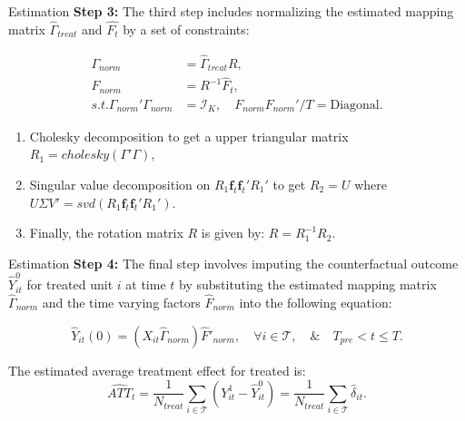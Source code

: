 \documentclass{beamer}
\begin{document}
\begin{frame}{Estimation}    
    \textbf{Step 3:} The third step includes normalizing the estimated mapping matrix $\hat{\Gamma}_{treat}$ and $\hat{F_t}$ by a set of constraints:
    
    \begin{equation*}
    \begin{aligned}
    \Gamma_{norm} &= \hat{\Gamma}_{treat} R, \\
    F_{norm} &= R^{-1} \hat{F}_t, \\
    s.t. \Gamma_{norm}'\Gamma_{norm} &= \mathcal{I}_K, \quad F_{norm} F_{norm}'/T = \text{Diagonal}.
    \end{aligned}
    \end{equation*}
    
    \begin{enumerate}
        \item Cholesky decomposition to get a upper triangular matrix $R_1 = cholesky(\Gamma' \Gamma)$,
        \item Singular value decomposition on $R_1\boldsymbol{f}_t\boldsymbol{f}_t'R_1'$ to get $R_2 = U$ where $U\Sigma V'=svd(R_1\boldsymbol{f}_t\boldsymbol{f}_t'R_1')$.
        \item Finally, the rotation matrix $R$ is given by: $R = R_1^{-1}R_2.$
        \end{enumerate}
\end{frame}

\begin{frame}{Estimation}
    \textbf{Step 4:} The final step involves imputing the counterfactual outcome $\hat{Y}_{it}^0$ for treated unit $i$ at time $t$ by substituting the estimated mapping matrix $\hat{\Gamma}_{norm}$ and the time varying factors $\hat{F}_{norm}$ into the following equation:
    
    \begin{equation*}
    \hat{Y}_{it}(0) = (X_{it} \hat{\Gamma}_{norm}) \hat{F}'_{norm}, \quad \forall i \in \mathcal{T}, \quad \& \quad T_{pre} < t \leq T.
    \end{equation*}    
    
    The estimated average treatment effect for treated is:
    \begin{equation*}
        \widehat{ATT}_{t} = \frac{1}{N_{treat}}\sum_{i \in \mathcal{T}} \left( Y_{it}^1 - \hat{Y}_{it}^0 \right) = \frac{1}{N_{treat}}\sum_{i \in \mathcal{T}}\hat{\delta}_{it}.
    \end{equation*}
\end{frame}
\end{document}

